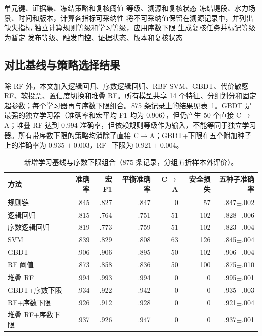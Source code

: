 \documentclass[10pt,twocolumn,a4paper]{ctexart}
\begin{document}
\begin{algorithm}[t]
\caption{在线评价单元分级}
\label{alg:onlinezh}
\begin{algorithmic}[1]
\Require 单元键、证据集、冻结策略和复核阈值
\Ensure 等级、溯源和复核状态
\State 冻结堤段、水力场景、时间和版本，计算各指标可采纳性
\State 将不可采纳值保留在溯源记录中，并列出缺失指标
\State 独立计算规则等级和学习等级，应用序数下限
  \State 生成复核任务并标记等级为暂定
\EndIf
\State 发布等级、触发门控、证据状态、版本和复核状态
\end{algorithmic}
\end{algorithm}

\subsection{对比基线与策略选择结果}
除 RF 外，本文加入逻辑回归、序数逻辑回归、RBF-SVM、GBDT、代价敏感 RF、软投票、置信度切换和堆叠 RF。所有模型共享 14 个特征、分组划分和固定超参数；每个学习器再与序数下限组合。875 条记录上的结果见表~\ref{tab:baselineszh}。GBDT 是最强的独立学习器（准确率和宏平均 F1 均为 0.906），但仍产生 50 个直接 C\(\to\)A；堆叠 RF 达到 0.994 准确率，但依赖规则等级作为输入，不能等同于独立学习器。所有带序数下限的策略均消除了直接 C\(\to\)A；GBDT+下限在五个附加种子上的准确率为 \(0.935\pm0.003\)，RF+下限为 \(0.921\pm0.004\)。

\begin{table}[t]
\caption{新增学习基线与序数下限组合（875 条记录，分组五折样本外评价）。}
\label{tab:baselineszh}
\centering\footnotesize
\setlength{\tabcolsep}{4pt}
\begin{tabular}{@{}lrrrrrr@{}}
\toprule
方法 & 准确率 & 宏F1 & 平衡准确率 & C\(\to\)A & 安全损失 & 五种子准确率\\
\midrule
规则链 & .845 & .827 & .847 & 0 & 57 & .847$\pm$.002\\
逻辑回归 & .815 & .764 & .751 & 51 & 102 & .828$\pm$.006\\
序数逻辑回归 & .819 & .773 & .759 & 51 & 102 & .823$\pm$.004\\
SVM & .839 & .829 & .808 & 63 & 126 & .845$\pm$.004\\
GBDT & .906 & .906 & .895 & 50 & 102 & .906$\pm$.004\\
RF 阈值 & .873 & .858 & .836 & 50 & 100 & .875$\pm$.010\\
堆叠 RF & .994 & .993 & .994 & 0 & 0 & .995$\pm$.001\\
GBDT+序数下限 & .934 & .922 & .942 & 0 & 0 & .935$\pm$.003\\
\rowcolor{floorc!10}RF+序数下限 & .926 & .912 & .928 & 0 & 0 & .921$\pm$.004\\
堆叠 RF+序数下限 & .937 & .926 & .947 & 0 & 0 & .937$\pm$.001\\
\bottomrule
\end{tabular}
\end{table}
\end{document}
